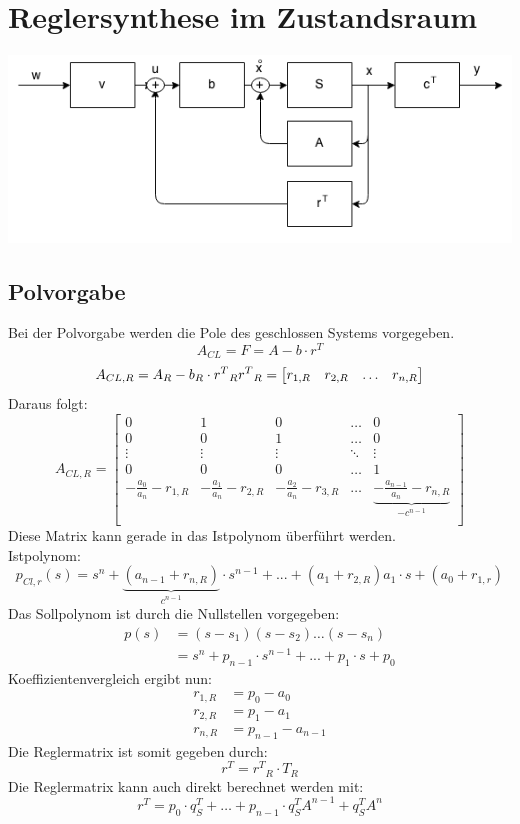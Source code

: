 \section{Reglersynthese im Zustandsraum}
\begin{center}
	\includegraphics[scale = 0.4]{images/zustandsregler.png}
\end{center}
\subsection{Polvorgabe}
Bei der Polvorgabe werden die Pole des geschlossen Systems vorgegeben.
\[
	A_{CL}=F= A-b\cdot r^T
\]
\[
	A_{CL,R}= A_R-b_R\cdot {r^T}_R	\\	{r^T}_R=
		\begin{bmatrix}
				r_{1,R}	&	r_{2,R}	& \ldots &r_{n,R}\\
		\end{bmatrix}
\]
Daraus folgt:
\[
		A_{CL,R}=
		\begin{bmatrix}
			0 &	1 & 0 & \ldots & 0\\
			0 & 0 & 1 & \ldots & 0\\
			\vdots & \vdots & \vdots & \ddots & \vdots \\
			0 & 0 & 0 & \ldots & 1\\
			-\frac{a_0}{a_n}-r_{1,R}  &-\frac{a_1}{a_n}-r_{2,R} & -\frac{a_2}{a_n}-r_{3,R} & \ldots &\underbrace{-\frac{a_{n-1}}{a_n}-r_{n,R}}_{\textbf{$-c^{n-1}$}}\\	
		\end{bmatrix}
\]
Diese Matrix kann gerade in das Istpolynom überführt werden.
\\
Istpolynom:
\[
	p_{Cl,r}(s)=s^n+
	\underbrace{(a_{n-1}+r_{n,R})	}_{\textbf{$c^{n-1}$}}
	\cdot s^{n-1}+...+(a_{1}+r_{2,R})a_1\cdot s +(a_0+r_{1,r})
\]
Das Sollpolynom ist durch die Nullstellen vorgegeben:
\[\begin{aligned}
	p(s) &= (s-s_1)(s-s_2)\ldots(s-s_n)\\
	&=s^n+p_{n-1}\cdot s^{n-1}+...+p_1\cdot s +p_0
\end{aligned}\]
Koeffizientenvergleich ergibt nun:
\[\begin{aligned}
	r_{1,R}&=p_0-a_0 \\
	r_{2,R}&=p_1-a_1 \\
	r_{n,R}&=p_{n-1}-a_{n-1}
\end{aligned}\]
Die Reglermatrix ist somit gegeben durch:
\[
	r^T={r^T}_R \cdot T_R
\]
Die Reglermatrix kann auch direkt berechnet werden mit:
\[
	r^T = p_0 \cdot q^T_S + \ldots + p_{n-1}\cdot q^T_S A^{n-1} + q^T_S A^n
\]




